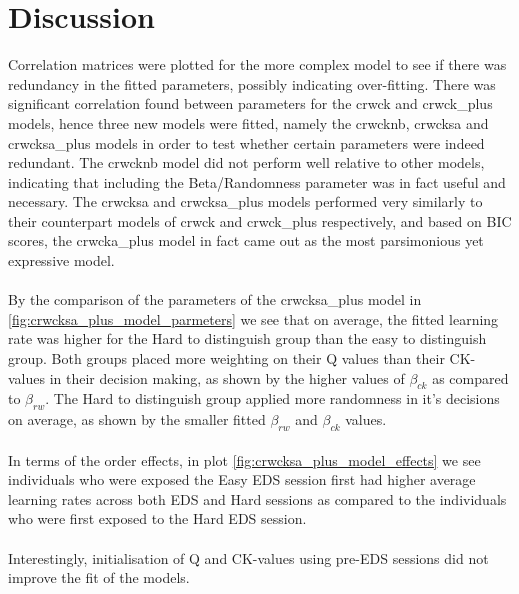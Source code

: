 \documentclass[12pt]{article}
\begin{document}
\section{Discussion}

Correlation matrices were plotted for the more complex model to see if there was redundancy in the fitted parameters, possibly indicating over-fitting. There was significant correlation found between parameters for the crwck and crwck\_plus models, hence three new models were fitted, namely the crwcknb, crwcksa and crwcksa\_plus models in order to test whether certain parameters were indeed redundant. The crwcknb model did not perform well relative to other models, indicating that including the Beta/Randomness parameter was in fact useful and necessary. The crwcksa and crwcksa\_plus models performed very similarly to their counterpart models of crwck and crwck\_plus respectively, and based on BIC scores, the crwcka\_plus model in fact came out as the most parsimonious yet expressive model.
\\\\
By the comparison of the parameters of the crwcksa\_plus model in \ref{fig:crwcksa_plus_model_parmeters} we see that on average, the fitted learning rate was higher for the Hard to distinguish group than the easy to distinguish group. Both groups placed more weighting on their Q values than their CK-values in their decision making, as shown by the higher values of $\beta_{ck}$ as compared to $\beta_{rw}$. The Hard to distinguish group applied more randomness in it's decisions on average, as shown by the smaller fitted $\beta_{rw}$ and $\beta_{ck}$ values.
\\\\
In terms of the order effects, in plot \ref{fig:crwcksa_plus_model_effects} we see individuals who were exposed the Easy EDS session first had higher average learning rates across both EDS and Hard sessions as compared to the individuals who were first exposed to the Hard EDS session.
\\\\
Interestingly, initialisation of Q and CK-values using pre-EDS sessions did not improve the fit of the models.
\newpage
\clearpage

\printbibliography[title={References}, heading=bibintoc] %
\end{document}
